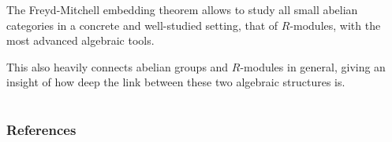 \documentclass{beamer}
\begin{document}
\begin{frame}
    The Freyd-Mitchell embedding theorem allows to study all small
    abelian categories in a concrete and well-studied setting, that
    of $R$-modules, with the most advanced algebraic tools. \medskip

    This also heavily connects abelian groups and $R$-modules in general,
    giving an insight of how deep the link between these two
    algebraic structures is.
\end{frame}


\section*{}

\nocite{*}

\begin{frame}
        \frametitle{References}
        \printbibliography
\end{frame}
\end{document}
